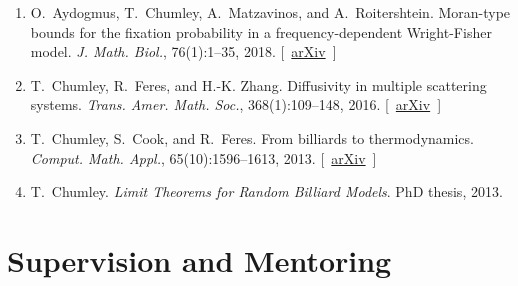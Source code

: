 \documentclass[10pt,letterpaper]{article}
\begin{document}
\begin{enumerate}
  R.~Feres. Rolling and no-slip bouncing in cylinders. \emph{J. Geom.
  Mech.}, 12(1):53--84, 2020.
  {[}~\href{http://arxiv.org/abs/1808.08448}{arXiv}~{]}
\item
  \protect\hypertarget{ACMR2016}{}{} O.~Aydogmus, T.~Chumley,
  A.~Matzavinos, and A.~Roitershtein. Moran-type bounds for the fixation
  probability in a frequency-dependent Wright-Fisher model. \emph{J.
  Math. Biol.}, 76(1):1--35, 2018.
  {[}~\href{http://arxiv.org/abs/1609.00838}{arXiv}~{]}
\item
  \protect\hypertarget{CFZ2016}{}{} T.~Chumley, R.~Feres, and H.-K.
  Zhang. Diffusivity in multiple scattering systems. \emph{Trans. Amer.
  Math. Soc.}, 368(1):109--148, 2016.
  {[}~\href{http://arxiv.org/abs/1302.4339}{arXiv}~{]}
\item
  \protect\hypertarget{CCF2013}{}{} T.~Chumley, S.~Cook, and R.~Feres.
  From billiards to thermodynamics. \emph{Comput. Math. Appl.},
  65(10):1596--1613, 2013.
  {[}~\href{http://arxiv.org/abs/1207.5878}{arXiv}~{]}
\item
  \protect\hypertarget{CT}{}{} T.~Chumley. \emph{Limit Theorems for
  Random Billiard Models}. PhD thesis, 2013.
\end{enumerate}

\hypertarget{supervision-and-mentoring}{%
\section*{Supervision and Mentoring}\label{supervision-and-mentoring}}
\end{document}
